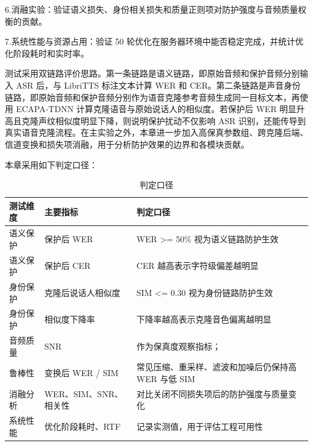 6.消融实验：验证语义损失、身份相关损失和质量正则项对防护强度与音频质量权衡的贡献。

7.系统性能与资源占用：验证 50
轮优化在服务器环境中能否稳定完成，并统计优化阶段耗时和实时率。

测试采用双链路评价思路。第一条链路是语义链路，即原始音频和保护音频分别输入
ASR 后，与 LibriTTS 标注文本计算 WER 和
CER。第二条链路是声音身份链路，即原始音频和保护音频分别作为语音克隆参考音频生成同一目标文本，再使用
ECAPA-TDNN 计算克隆语音与原始说话人的相似度。若保护后 WER
明显升高且克隆声纹相似度明显下降，则说明保护扰动不仅影响 ASR
识别，还能传导到真实语音克隆流程。在主实验之外，本章进一步加入高保真参数组、跨克隆后端、信道变换和损失项消融，用于分析防护效果的边界和各模块贡献。

本章采用如下判定口径：

{\def\LTcaptype{table} %
\begin{longtable}[]{@{}
  >{\centering\arraybackslash}m{}
  >{\centering\arraybackslash}m{}
  >{\centering\arraybackslash}m{}@{}}
\caption{判定口径}\\
\toprule\noalign{}
\begin{minipage}[b]{\linewidth}\centering
\textbf{测试维度}
\end{minipage} & \begin{minipage}[b]{\linewidth}\centering
\textbf{主要指标}
\end{minipage} & \begin{minipage}[b]{\linewidth}\centering
\textbf{判定口径}
\end{minipage} \\
\midrule\noalign{}
\endhead
\bottomrule\noalign{}
\endlastfoot
语义保护 & 保护后 WER & WER \textgreater= 50\% 视为语义链路防护生效 \\
语义保护 & 保护后 CER & CER 越高表示字符级偏差越明显 \\
身份保护 & 克隆后说话人相似度 & SIM \textless= 0.30
视为身份链路防护生效 \\
身份保护 & 相似度下降率 & 下降率越高表示克隆音色偏离越明显 \\
音频质量 & SNR & 作为保真度观察指标； \\
鲁棒性 & 变换后 WER / SIM & 常见压缩、重采样、滤波和加噪后仍保持高 WER
与低 SIM \\
消融分析 & WER、SIM、SNR、相关性 &
对比关闭不同损失项后的防护强度与质量变化 \\
系统性能 & 优化阶段耗时、RTF & 记录实测值，用于评估工程可用性 \\
\end{longtable}
}

